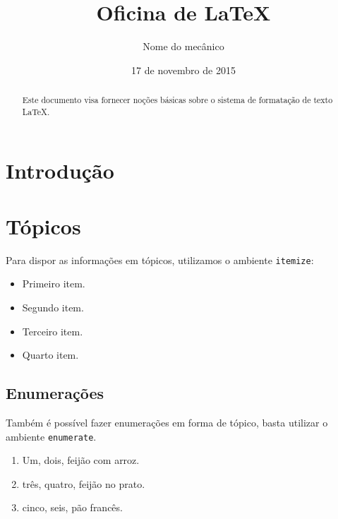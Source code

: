 \documentclass{article}
\author{Nome do mecânico} %
\date{17 de novembro de 2015} %
\title{Oficina de \LaTeX} %
\begin{document}
\maketitle %

\begin{abstract}
Este documento visa fornecer noções básicas sobre o sistema de formatação de texto \LaTeX.
\end{abstract}
\section{Introdução}
\lipsum[3]
\section{Tópicos}
Para dispor as informações em tópicos, utilizamos o ambiente {\tt itemize}:
\begin{itemize}
	\item Primeiro item.
	\item Segundo item.
	\item Terceiro item.
	\item Quarto item.
\end{itemize}

\subsection{Enumerações}

Também é possível fazer enumerações em forma de tópico, basta utilizar o ambiente {\tt enumerate}.
\begin{enumerate}
	\item Um, dois, feijão com arroz.
	\item três, quatro, feijão no prato.
	\item cinco, seis, pão francês.
\end{enumerate}
\end{document}
